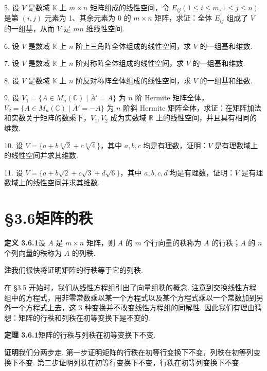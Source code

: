 \documentclass[UTF8,12pt,a4paper,fontset=fandol]{ctexart}
\begin{document}
5. 设 $V$ 是数域 $\mathbb{K}$ 上 $m\times n$ 矩阵组成的线性空间，令 $E_{ij}(1\leq i\leq m,1\leq j\leq n)$ 是第 $(i,j)$ 元素为 1、其余元素为 0 的 $m\times n$ 矩阵，求证：全体 $E_{ij}$ 组成了 $V$ 的一组基，从而 $V$ 是 $mn$ 维线性空间.

6. 设 $V$ 是数域 $\mathbb{K}$ 上 $n$ 阶上三角阵全体组成的线性空间，求 $V$ 的一组基和维数.

7. 设 $V$ 是数域 $\mathbb{K}$ 上 $n$ 阶对称阵全体组成的线性空间，求 $V$ 的一组基和维数.

8. 设 $V$ 是数域 $\mathbb{K}$ 上 $n$ 阶反对称阵全体组成的线性空间，求 $V$ 的一组基和维数.

9. 设 $V_1=\{A\in M_n(\mathbb{C})\mid \overline{A}'=A\}$ 为 $n$ 阶 Hermite 矩阵全体，$V_2=\{A\in M_n(\mathbb{C})\mid \overline{A}'=-A\}$ 为 $n$ 阶斜 Hermite 矩阵全体，求证：在矩阵加法和实数关于矩阵的数乘下，$V_1,V_2$ 成为实数域 $\mathbb{R}$ 上的线性空间，并且具有相同的维数.

10. 设 $V=\{a+b\sqrt[3]{2}+c\sqrt[3]{4}\}$，其中 $a,b,c$ 均是有理数，证明：$V$ 是有理数域上的线性空间并求其维数.

11. 设 $V=\{a+b\sqrt{2}+c\sqrt{3}+d\sqrt{6}\}$，其中 $a,b,c,d$ 均是有理数，证明：$V$ 是有理数域上的线性空间并求其维数.

\section*{§3.6\quad 矩阵的秩}

\noindent\textbf{定义 3.6.1}\quad 设 $A$ 是 $m\times n$ 矩阵，则 $A$ 的 $m$ 个行向量的秩称为 $A$ 的行秩；$A$ 的 $n$ 个列向量的秩称为 $A$ 的列秩.

\noindent\textbf{注}\quad 我们很快将证明矩阵的行秩等于它的列秩.

在 §3.5 开始时，我们从线性方程组引出了向量组秩的概念. 注意到交换线性方程组中的方程式，用非零常数乘以某一个方程式以及某个方程式乘以一个常数加到另外一个方程式上去，这 3 种变换并不改变线性方程组的同解性. 因此我们有理由猜想：矩阵的行秩和列秩在初等变换下是不变的.

\noindent\textbf{定理 3.6.1}\quad 矩阵的行秩与列秩在初等变换下不变.

\noindent\textbf{证明}\quad 我们分两步走. 第一步证明矩阵的行秩在初等行变换下不变，列秩在初等列变换下不变. 第二步证明列秩在初等行变换下不变，行秩在初等列变换下不变.
\end{document}
